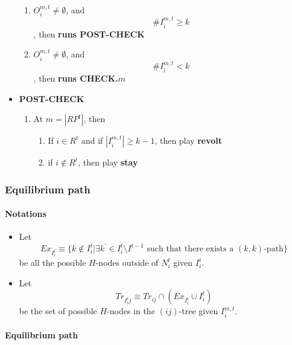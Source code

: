 \documentclass[12pt]{article}
\theoremstyle{remark}
\theoremstyle{remark}
\begin{document}
\begin{itemize}
\begin{enumerate}
\item $O^{m,t}_i\neq \emptyset$, and
 \[\# I^{m,t}_i\geq k\]
, then 
\textbf{runs POST-CHECK }

\item $O^{m,t}_i\neq \emptyset$, and 
\[ \#I^{m,t}_i< k\]
, then \textbf{runs CHECK.$m$}
\end{enumerate}


\item \textbf{POST-CHECK}

\begin{enumerate}


\item At $m=|RP^t|$, then
\begin{enumerate}
\item If $i\in R^t$ and if $|I^{m,t}_i|\geq k-1$, then play
\textbf{revolt}

\item if $i\notin R^t$, then play
\textbf{stay}


\end{enumerate}
\end{enumerate}


\end{itemize}



\subsubsection{Equilibrium path}
\paragraph{Notations}
\begin{itemize}
\item Let 
\[Ex_{I^{t}_i}\equiv \{k\notin I^{t}_i|\exists k^{'}\in I^{t}_i\setminus I^{t-1}\text{ such that there exists a $(k,k)$-path}\}\]
be all the possible $H$-nodes outside of $N^{t}_i$ given $I^{t}_i$.

\item Let
\[Tr_{I^{t}_ij}\equiv Tr_{ij}\cap (Ex_{I^{t}_i}\cup I^{t}_i)\]
be the set of possible $H$-nodes in the $(ij)$-tree given $I^{m,t}_i$. 
\end{itemize}




\paragraph{Equilibrium path}
\end{document}
